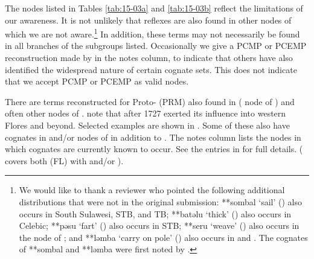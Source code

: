 The nodes listed in Tables \ref{tab:15-03a} and \ref{tab:15-03b}
reflect the limitations of our awareness.
It is not unlikely that reflexes are also found in other nodes
of which we are not aware.\footnote{
		We would like to thank a reviewer who pointed the following additional
		distributions that were not in the original submission: **sombal
		‘sail’ () also occurs in South Sulawesi,
		STB, and TB; **batəlu ‘thick’ () also occurs in Celebic;
		**pəsu ‘fart’ () also occurs in STB; **seru ‘weave’
		() also occurs in the  node of ;
		and **ləmba ‘carry on pole’ () also occurs in  and .
		The  cognates of **sombal
		and **ləmba were first noted by \citet[68, 70]{Mills1981}.}
In addition,
these terms may not necessarily be found in all branches of the subgroups listed.
Occasionally we give a PCMP or PCEMP reconstruction made by \citet{BlustTrussel2020}
in the notes column,
to indicate that others have also identified the widespread nature
of certain cognate sets.
This does not indicate that we accept PCMP or PCEMP as valid nodes.

There are terms reconstructed for Proto- (PRM)
also found in  ( node of )
and often other nodes of .
\citet{VerheijenGrimes1995} note that after 1727  exerted
its influence into western Flores and beyond.
Selected examples are shown in .
Some of these also have cognates in  and/or
nodes of  in addition to .
The notes column lists the nodes in which cognates are currently known to occur.
See the entries in \citet{Edwards2021} for full details.
( covers both  (FL) with  and/or ).

